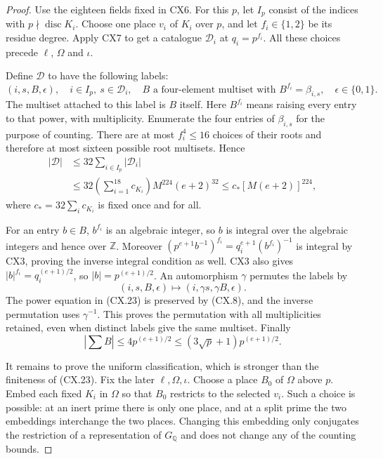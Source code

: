 \begin{proof}
Use the eighteen fields fixed in CX6.  For this $p$, let
$I_p$ consist of the indices with $p\nmid\operatorname{disc}K_i$.
Choose one place $v_i$ of $K_i$ over $p$, and let
$f_i\in\{1,2\}$ be its residue degree.  Apply CX7 to get
a catalogue $\mathcal D_i$ at $q_i=p^{f_i}$.
All these choices precede $\ell$, $\Omega$ and $\iota$.

Define $\mathcal D$ to have the following labels:
\[
 (i,s,B,\epsilon),\quad
 i\in I_p,\ s\in\mathcal D_i,\quad
 B\text{ a four-element multiset with }B^{f_i}=\beta_{i,s},
 \quad \epsilon\in\{0,1\}.                                  \tag{CX.23}
\]
The multiset attached to this label is $B$ itself.
Here $B^{f_i}$ means raising every entry to that power,
with multiplicity.  Enumerate the four entries of
$\beta_{i,s}$ for the purpose of counting.  There are at
most $f_i^4\le16$ choices of their roots and therefore at
most sixteen possible root multisets.  Hence
\[
 \begin{aligned}
 |\mathcal D|
   &\le32\sum_{i\in I_p}|\mathcal D_i|\\
   &\le32\left(\sum_{i=1}^{18}c_{K_i}\right)
                   M^{224}(e+2)^{32}
    \le c_*[M(e+2)]^{224},
 \end{aligned}                                                \tag{CX.24}
\]
where $c_*=32\sum_i c_{K_i}$ is fixed once and for all.

For an entry $b\in B$, $b^{f_i}$ is an algebraic integer,
so $b$ is integral over the algebraic integers and hence
over $\mathbb Z$.  Moreover
$(p^{e+1}b^{-1})^{f_i}=q_i^{e+1}(b^{f_i})^{-1}$ is
integral by CX3, proving the inverse integral condition
as well.  CX3 also gives
$|b|^{f_i}=q_i^{(e+1)/2}$, so
$|b|=p^{(e+1)/2}$.  An automorphism $\gamma$ permutes
the labels by
\[
        (i,s,B,\epsilon)\longmapsto
          (i,\gamma s,\gamma B,\epsilon).                    \tag{CX.25}
\]
The power equation in (CX.23) is preserved by (CX.8), and
the inverse permutation uses $\gamma^{-1}$.  This proves
the permutation with all multiplicities retained, even
when distinct labels give the same multiset.  Finally
\[
       \left|\sum B\right|
          \le4p^{(e+1)/2}
          \le(3\sqrt p+1)p^{(e+1)/2}.                         \tag{CX.26}
\]

It remains to prove the uniform classification, which is
stronger than the finiteness of (CX.23).  Fix the later
$\ell,\Omega,\iota$.  Choose a place $B_0$ of $\Omega$
above $p$.  Embed each fixed $K_i$ in $\Omega$ so that
$B_0$ restricts to the selected $v_i$.  Such a choice is
possible: at an inert prime there is only one place, and
at a split prime the two embeddings interchange the two
places.  Changing this embedding only conjugates the
restriction of a representation of $G_{\mathbb Q}$ and
does not change any of the counting bounds.


\end{proof}
